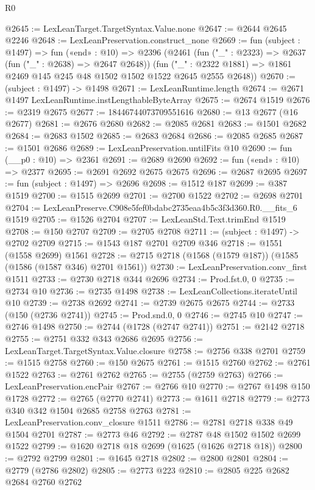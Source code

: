 \begin{lexlean}{R0}
\begin{coremodule}
@2645 := LexLeanTarget.TargetSyntax.Value.none
@2647 := @2644 @2645 @2246
@2648 := LexLeanPreservation.construct_none
@2669 := fun (subject : @1497) =>
  fun («end» : @10) =>
  @2396
    (@2461
      (fun ("_" : @2323) => @2637 (fun ("_" : @2638) => @2647 @2648))
      (fun ("_" : @2322 @1881) => @1861 @2469 @145 @245 @48 @1502 @1502 @1522 @2645 @2555 @2648))
@2670 := (subject : @1497) -> @1498
@2671 := LexLeanRuntime.length
@2674 := @2671 @1497 LexLeanRuntime.instLengthableByteArray
@2675 := @2674 @1519
@2676 := @2319 @2675
@2677 := 18446744073709551616
@2680 := @13 @2677 (@16 @2677)
@2681 := @2676 @2680
@2682 := @2085 @2681
@2683 := @1501 @2682
@2684 := @2683 @1502
@2685 := @2683 @2684
@2686 := @2085 @2685
@2687 := @1501 @2686
@2689 := LexLeanPreservation.untilFits @10
@2690 := fun (__p0 : @10) => @2361
@2691 := @2689 @2690
@2692 := fun («end» : @10) => @2377
@2695 := @2691 @2692 @2675 @2675
@2696 := @2687 @2695
@2697 := fun (subject : @1497) => @2696
@2698 := @1512 @187
@2699 := @387 @1519
@2700 := @1515 @2699
@2701 := @2700 @1522
@2702 := @2698 @2701
@2704 := LexLeanPreserve.C908e5fef0bdabc2735eaa4b5c3f3d360.R0.__fits_6 @1519
@2705 := @1526 @2704
@2707 := LexLeanStd.Text.trimEnd @1519
@2708 := @150 @2707
@2709 := @2705 @2708
@2711 := (subject : @1497) -> @2702 @2709
@2715 := @1543 @187 @2701 @2709 @346
@2718 := @1551 (@1558 @2699) @1561
@2728 := @2715 @2718 (@1568 (@1579 @187)) (@1585 (@1586 (@1587 @346) @2701 @1561))
@2730 := LexLeanPreservation.conv_first @1511
@2733 := @2730 @2718 @344 @2696
@2734 := Prod.fst.{0, 0}
@2735 := @2734 @10
@2736 := @2735 @1498
@2738 := LexLeanCollections.iterateUntil @10
@2739 := @2738 @2692
@2741 := @2739 @2675 @2675
@2744 := @2733 (@150 (@2736 @2741))
@2745 := Prod.snd.{0, 0}
@2746 := @2745 @10
@2747 := @2746 @1498
@2750 := @2744 (@1728 (@2747 @2741))
@2751 := @2142 @2718
@2755 := @2751 @332 @343 @2686 @2695
@2756 := LexLeanTarget.TargetSyntax.Value.closure
@2758 := @2756 @338 @2701
@2759 := @1515 @2758
@2760 := @150 @2675
@2761 := @1515 @2760
@2762 := @2761 @1522
@2763 := @2761 @2762
@2765 := @2755 (@2759 @2763)
@2766 := LexLeanPreservation.encPair
@2767 := @2766 @10
@2770 := @2767 @1498 @150 @1728
@2772 := @2765 (@2770 @2741)
@2773 := @1611 @2718
@2779 := @2773 @340 @342 @1504 @2685 @2758 @2763
@2781 := LexLeanPreservation.conv_closure @1511
@2786 := @2781 @2718 @338 @49 @1504 @2701
@2787 := @2773 @46
@2792 := @2787 @48 @1502 @1502 @2699 @1522
@2799 := @1620 @2718 @18 @2699 (@1625 (@1626 @2718 @18))
@2800 := @2792 @2799
@2801 := @1645 @2718
@2802 := @2800 @2801
@2804 := @2779 (@2786 @2802)
@2805 := @2773 @223
@2810 := @2805 @225 @2682 @2684 @2760 @2762

\end{coremodule}
\end{lexlean}
